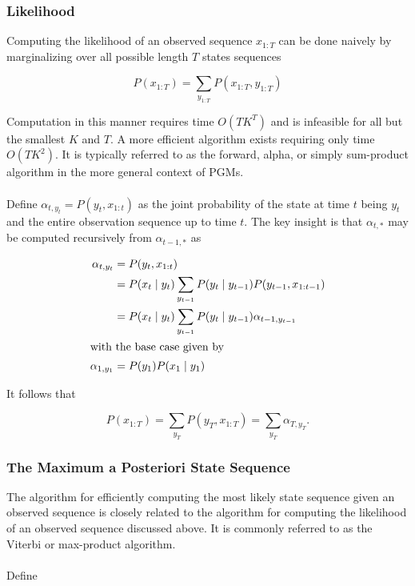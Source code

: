 \documentclass[12pt]{report}
\newcommand{\1}[0]{\mathbbm{1}}
\newcommand{\seq}[3]{\ensuremath{#1_{{#2}:{#3}}}}
\begin{document}
\subsubsection{Likelihood}
Computing the likelihood of an observed sequence $\seq{x}{1}{T}$ can be done naively
by marginalizing over all possible length $T$ states sequences

\[
    P(\seq{x}{1}{T}) = \sum_{\seq{y}{1}{T}} P(\seq{x}{1}{T}, \seq{y}{1}{T})
\]

Computation in this manner requires time $O(TK^T)$ and is infeasible for all
but the smallest $K$ and $T$. A more efficient algorithm exists requiring only time
$O(TK^2)$. It is typically referred to as the forward, alpha, or
simply sum-product algorithm in the more general context of \acp{PGM}.
\\\\
Define $\alpha_{t,y_t} = P(y_t, \seq{x}{1}{t})$ as the joint probability
of the state at time $t$ being $y_t$ and the entire observation sequence up to
time $t$. The key insight is that $\alpha_{t,*}$ may be computed recursively
from $\alpha_{t-1,*}$ as

\begin{align*}
    \alpha_{t,y_t}
    &= P(y_t, \seq{x}{1}{t}) \\
    &= P(x_t \mid y_t) \sum_{y_{t-1}} P(y_t \mid y_{t-1}) P(y_{t-1}, \seq{x}{1}{t-1}) \\
    &= P(x_t \mid y_t) \sum_{y_{t-1}} P(y_t \mid y_{t-1}) \alpha_{t-1,y_{t-1}} \\
\intertext{with the base case given by}
    \alpha_{1,y_1} &= P(y_1)P(x_1 \mid y_1)\\
\end{align*}

It follows that

\[
    P(\seq{x}{1}{T}) = \sum_{y_T} P(y_T, \seq{x}{1}{T}) = \sum_{y_T} \alpha_{T,y_T}.
\]

\subsubsection{The Maximum a Posteriori State Sequence}
The algorithm for efficiently computing the most likely state sequence given an
observed sequence is closely related to the algorithm for computing the likelihood
of an observed sequence discussed above.
It is commonly referred to as the Viterbi or max-product algorithm.
\\\\
Define
\end{document}
